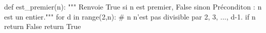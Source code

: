 
\begin{pyverbatim}
def est_premier(n):
    """ Renvoie True si n est premier, False sinon
        Préconditon : n est un entier."""
    for d in range(2,n):
        # n n'est pas divisible par 2, 3, ..., d-1.
        if n %
            return False
    return True
\end{pyverbatim}